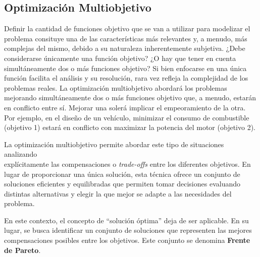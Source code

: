 \documentclass[12pt,a4paper]{book}
\begin{document}
\subsection{Optimización Multiobjetivo}

Definir la cantidad de funciones objetivo que se van a utilizar para modelizar el problema consituye una de las características más relevantes y, a menudo, más complejas del mismo, debido a su naturaleza inherentemente subjetiva.
¿Debe considerarse únicamente una función objetivo? ¿O hay que tener en cuenta simultáneamente 
dos o más funciones objetivo? Si bien enfocarse en una única función facilita el análisis y su resolución, rara vez refleja la complejidad de los problemas reales. La optimización multiobjetivo
abordará los problemas mejorando simultáneamente dos o más funciones objetivo que, a menudo, estarán en conflicto entre sí. Mejorar una solerá implicar el empeoramiento de la otra.
Por ejemplo, en el diseño de un vehículo, minimizar el consumo de combustible (objetivo 1) estará en conflicto con maximizar la potencia del motor (objetivo 2).

La optimización multiobjetivo permite abordar este tipo de situaciones analizando\\
explícitamente las compensaciones o \textit{trade-offs} entre los diferentes objetivos. En lugar de proporcionar una única solución, esta técnica ofrece un conjunto de soluciones eficientes y equilibradas que permiten
tomar decisiones evaluando distintas alternativas y elegir la que mejor se adapte a las necesidades del problema.

En este contexto, el concepto de “solución óptima” deja de ser aplicable. En su lugar, se busca identificar un conjunto de soluciones que representen las mejores compensaciones posibles entre los objetivos. Este conjunto se denomina \textbf{Frente de Pareto}.
\end{document}
